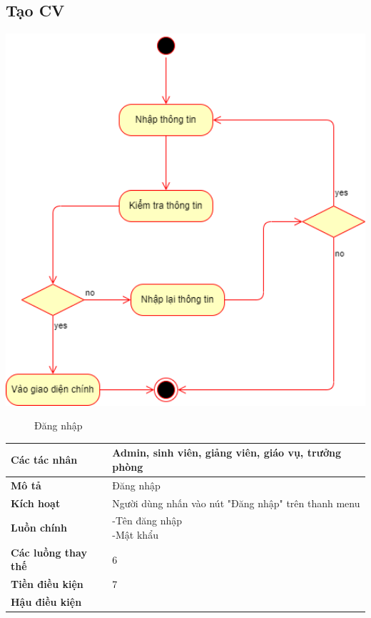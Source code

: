 \subsection{Tạo CV}
  \begin{center}
    \includegraphics[width=1.1\textwidth]{image/activity/login.png}
    \begin{figure}
      \centering
      \caption{Đăng nhập}
    \end{figure}
  \end{center}
  \begin{table}
    \begin{tabular}{|l|l|}
      \hline
      \textbf{Các tác nhân} & Admin, sinh viên, giảng viên, giáo vụ, trưởng phòng \\
      \hline
      \textbf{Mô tả} & Đăng nhập\\
      \hline
      \textbf{Kích hoạt} & Người dùng nhấn vào nút "Đăng nhập" trên thanh menu \\
      \hline 
      \textbf{Luồn chính} & \makecell[l]{-Tên đăng nhập \\ -Mật khẩu} \\
      \hline
      \textbf{Các luồng thay thế} & 6 \\
      \hline
      \textbf{Tiền điều kiện} & 7 \\
      \hline
      \textbf{Hậu điều kiện} & \\
      \hline
    \end{tabular}
  \end{table}

